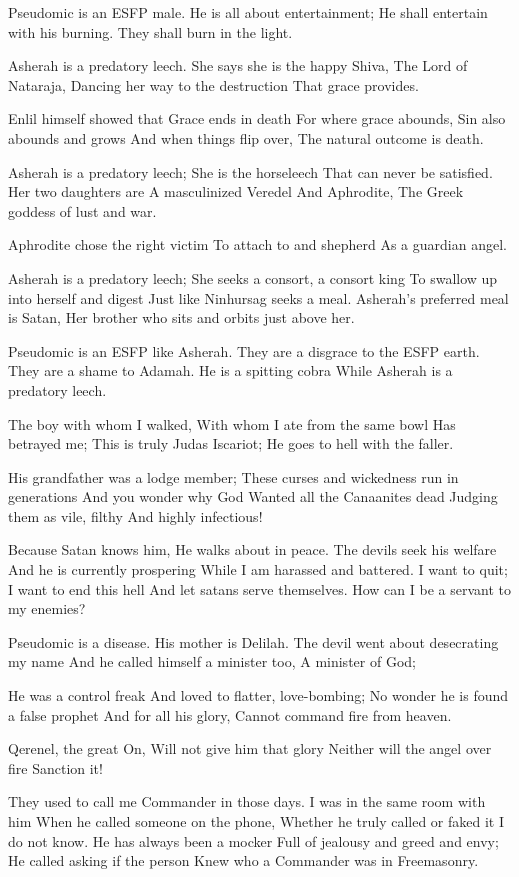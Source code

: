 \documentclass[
]{book}
\begin{document}
Pseudomic is an ESFP male.
He is all about entertainment;
He shall entertain with his burning.
They shall burn in the light.

Asherah is a predatory leech.
She says she is the happy Shiva,
The Lord of Nataraja,
Dancing her way to the destruction
That grace provides.

Enlil himself showed that
Grace ends in death
For where grace abounds,
Sin also abounds and grows
And when things flip over,
The natural outcome is death.

Asherah is a predatory leech;
She is the horseleech
That can never be satisfied.
Her two daughters are
A masculinized Veredel
And Aphrodite,
The Greek goddess of lust and war.

Aphrodite chose the right victim
To attach to and shepherd
As a guardian angel.

Asherah is a predatory leech;
She seeks a consort, a consort king
To swallow up into herself and digest
Just like Ninhursag seeks a meal.
Asherah's preferred meal is Satan,
Her brother who sits and orbits just above her.

Pseudomic is an ESFP like Asherah.
They are a disgrace to the ESFP earth.
They are a shame to Adamah.
He is a spitting cobra
While Asherah is a predatory leech.

The boy with whom I walked,
With whom I ate from the same bowl
Has betrayed me;
This is truly Judas Iscariot;
He goes to hell with the faller.

His grandfather was a lodge member;
These curses and wickedness run in generations
And you wonder why God
Wanted all the Canaanites dead
Judging them as vile, filthy
And highly infectious!

Because Satan knows him,
He walks about in peace.
The devils seek his welfare
And he is currently prospering
While I am harassed and battered.
I want to quit;
I want to end this hell
And let satans serve themselves.
How can I be a servant to my enemies?

Pseudomic is a disease.
His mother is Delilah.
The devil went about desecrating my name
And he called himself a minister too,
A minister of God;

He was a control freak
And loved to flatter, love-bombing;
No wonder he is found a false prophet
And for all his glory,
Cannot command fire from heaven.

Qerenel, the great On,
Will not give him that glory
Neither will the angel over fire
Sanction it!

They used to call me Commander in those days.
I was in the same room with him
When he called someone on the phone,
Whether he truly called or faked it I do not know.
He has always been a mocker
Full of jealousy and greed and envy;
He called asking if the person
Knew who a Commander was in Freemasonry.
\end{document}
